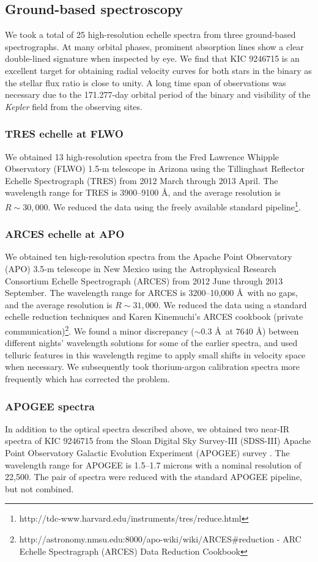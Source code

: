 \subsection{Ground-based spectroscopy}\label{spectra}
We took a total of 25 high-resolution echelle spectra from three ground-based spectrographs. At many orbital phases, prominent absorption lines show a clear double-lined signature when inspected by eye. We find that KIC 9246715 is an excellent target for obtaining radial velocity curves for both stars in the binary as the stellar flux ratio is close to unity. A long time span of observations was necessary due to the 171.277-day orbital period of the binary and visibility of the \emph{Kepler} field from the observing sites.

\subsubsection{TRES echelle at FLWO}\label{tres}
We obtained 13 high-resolution spectra from the Fred Lawrence Whipple Observatory (FLWO) 1.5-m telescope in Arizona using the Tillinghast Reflector Echelle Spectrograph (TRES) from 2012 March through 2013 April. The wavelength range for TRES is 3900--9100 \AA, and the average resolution is $R \sim 30,000$. We reduced the data using the freely available standard pipeline\footnote{http://tdc-www.harvard.edu/instruments/tres/reduce.html}.

\subsubsection{ARCES echelle at APO}\label{arces}
We obtained ten high-resolution spectra from the Apache Point Observatory (APO) 3.5-m telescope in New Mexico using the Astrophysical Research Consortium Echelle Spectrograph (ARCES) from 2012 June through 2013 September. The wavelength range for ARCES is 3200--10,000 \AA \ with no gaps, and the average resolution is $R \sim 31,000$. We reduced the data using a standard echelle reduction techniques and Karen Kinemuchi's ARCES cookbook (private communication)\footnote{http://astronomy.nmsu.edu:8000/apo-wiki/wiki/ARCES#reduction - ARC Echelle Spectragraph (ARCES) Data Reduction Cookbook}. We found a minor discrepancy ($\sim 0.3$ \AA \ at $7640$ \AA) between different nights' wavelength solutions for some of the earlier spectra, and used telluric features in this wavelength regime to apply small shifts in velocity space when necessary. We subsequently took thorium-argon calibration spectra more frequently which has corrected the problem.

\subsubsection{APOGEE spectra}\label{apogee}
In addition to the optical spectra described above, we obtained two near-IR spectra of KIC 9246715 from the Sloan Digital Sky Survey-III (SDSS-III) Apache Point Observatory Galactic Evolution Experiment (APOGEE) survey \citep{2015arXiv150100963A}. The wavelength range for APOGEE is 1.5--1.7 microns with a nominal resolution of 22,500. The pair of spectra were reduced with the standard APOGEE pipeline, but not combined.
